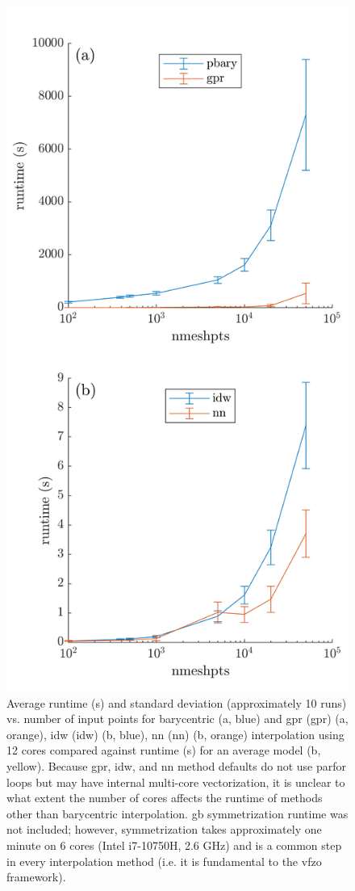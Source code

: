 \documentclass[preprint,12pt]{elsarticle}
\begin{document}
\begin{figure}
    \centering
    \includegraphics[scale=1]{runtime.png}
    \caption{
    Average runtime (s) and standard deviation (approximately 10 runs) vs. number of input points for barycentric (a, blue) and \acrlong{gpr} (\acrshort{gpr}) (a, orange), \acrlong{idw} (\acrshort{idw}) (b, blue), \acrlong{nn} (\acrshort{nn}) (b, orange) interpolation using 12 cores compared against runtime (s) for an average model (b, yellow). Because \acrshort{gpr}, \acrshort{idw}, and \acrshort{nn} method defaults do not use parfor loops but may have internal multi-core vectorization, it is unclear to what extent the number of cores affects the runtime of methods other than barycentric interpolation. \Acrlong{gb} symmetrization runtime was not included; however, symmetrization takes approximately one minute on 6 cores (Intel i7-10750H, 2.6 GHz) and is a common step in every interpolation method (i.e. it is fundamental to the \acrlong{vfzo} framework).
}
\end{figure}
\end{document}
